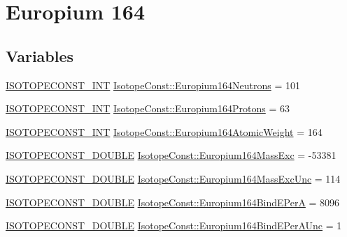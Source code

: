 \hypertarget{group___isotope_const-_europium-_eu164}{}\section{Europium 164}
\label{group___isotope_const-_europium-_eu164}
\subsection*{Variables}
\begin{DoxyCompactItemize}
\item 
\mbox{\hyperlink{group___isotope_const-_macros_ga5f18360b3e99483a35c32d789e62621c}{I\+S\+O\+T\+O\+P\+E\+C\+O\+N\+S\+T\+\_\+\+I\+NT}} \mbox{\hyperlink{group___isotope_const-_europium-_eu164_ga820cc75322be778ae548700b4f415e6f}{Isotope\+Const\+::\+Europium164\+Neutrons}} = 101
\item 
\mbox{\hyperlink{group___isotope_const-_macros_ga5f18360b3e99483a35c32d789e62621c}{I\+S\+O\+T\+O\+P\+E\+C\+O\+N\+S\+T\+\_\+\+I\+NT}} \mbox{\hyperlink{group___isotope_const-_europium-_eu164_ga03474db72f9cf2565dbf3d2b919606bc}{Isotope\+Const\+::\+Europium164\+Protons}} = 63
\item 
\mbox{\hyperlink{group___isotope_const-_macros_ga5f18360b3e99483a35c32d789e62621c}{I\+S\+O\+T\+O\+P\+E\+C\+O\+N\+S\+T\+\_\+\+I\+NT}} \mbox{\hyperlink{group___isotope_const-_europium-_eu164_gad132f846b4a2bbdba0ee973eddc16eb0}{Isotope\+Const\+::\+Europium164\+Atomic\+Weight}} = 164
\item 
\mbox{\hyperlink{group___isotope_const-_macros_ga8f45a7272ce02c0b4c65c44636ed719a}{I\+S\+O\+T\+O\+P\+E\+C\+O\+N\+S\+T\+\_\+\+D\+O\+U\+B\+LE}} \mbox{\hyperlink{group___isotope_const-_europium-_eu164_ga9106b4d7902d85254f9223a8be534033}{Isotope\+Const\+::\+Europium164\+Mass\+Exc}} = -\/53381
\item 
\mbox{\hyperlink{group___isotope_const-_macros_ga8f45a7272ce02c0b4c65c44636ed719a}{I\+S\+O\+T\+O\+P\+E\+C\+O\+N\+S\+T\+\_\+\+D\+O\+U\+B\+LE}} \mbox{\hyperlink{group___isotope_const-_europium-_eu164_gaa2868f6a9b39493c6dd4b2bbb1b0d5de}{Isotope\+Const\+::\+Europium164\+Mass\+Exc\+Unc}} = 114
\item 
\mbox{\hyperlink{group___isotope_const-_macros_ga8f45a7272ce02c0b4c65c44636ed719a}{I\+S\+O\+T\+O\+P\+E\+C\+O\+N\+S\+T\+\_\+\+D\+O\+U\+B\+LE}} \mbox{\hyperlink{group___isotope_const-_europium-_eu164_ga2be99c0bf3b8275de812b6690d613a32}{Isotope\+Const\+::\+Europium164\+Bind\+E\+PerA}} = 8096
\item 
\mbox{\hyperlink{group___isotope_const-_macros_ga8f45a7272ce02c0b4c65c44636ed719a}{I\+S\+O\+T\+O\+P\+E\+C\+O\+N\+S\+T\+\_\+\+D\+O\+U\+B\+LE}} \mbox{\hyperlink{group___isotope_const-_europium-_eu164_ga055e4063dfe7efc36358a468f7cfac8f}{Isotope\+Const\+::\+Europium164\+Bind\+E\+Per\+A\+Unc}} = 1

\end{DoxyCompactItemize}
